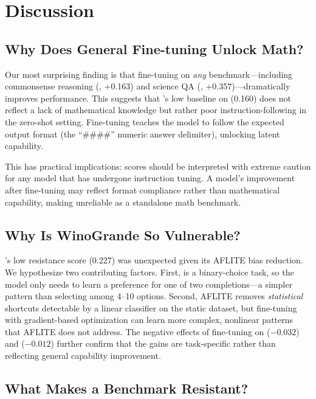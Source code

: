 \section{Discussion}
\label{sec:discussion}

\subsection{Why Does General Fine-tuning Unlock Math?}
\label{sec:math_unlock}

Our most surprising finding is that fine-tuning on \emph{any} benchmark---including commonsense reasoning (\wino, +0.163) and science QA (\arc, +0.357)---dramatically improves \gsmk performance. This suggests that \qwen's low baseline on \gsmk (0.160) does not reflect a lack of mathematical knowledge but rather poor instruction-following in the zero-shot setting. Fine-tuning teaches the model to follow the expected output format (the ``\#\#\#\#'' numeric answer delimiter), unlocking latent capability.

This has practical implications: \gsmk scores should be interpreted with extreme caution for any model that has undergone instruction tuning. A model's \gsmk improvement after fine-tuning may reflect format compliance rather than mathematical capability, making \gsmk unreliable as a standalone math benchmark.

\subsection{Why Is WinoGrande So Vulnerable?}
\label{sec:wino_vuln}

\wino's low resistance score (0.227) was unexpected given its AFLITE bias reduction. We hypothesize two contributing factors. First, \wino is a binary-choice task, so the model only needs to learn a preference for one of two completions---a simpler pattern than selecting among 4--10 options. Second, AFLITE removes \emph{statistical} shortcuts detectable by a linear classifier on the static dataset, but fine-tuning with gradient-based optimization can learn more complex, nonlinear patterns that AFLITE does not address. The negative effects of \wino fine-tuning on \mmlu ($-0.032$) and \mmlupro ($-0.012$) further confirm that the gains are task-specific rather than reflecting general capability improvement.

\subsection{What Makes a Benchmark Resistant?}
\label{sec:design_principles}

